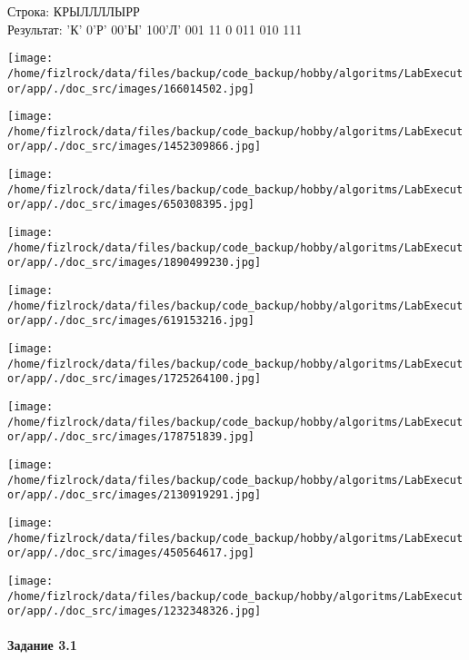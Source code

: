 \documentclass[a4paper, 12pt]{article}
\begin{document}
Строка: 
КРЫЛЛЛЛЫРР\\
Результат: 'К' 0'Р' 00'Ы' 100'Л' 001 11 0 011 010 111

\texttt{[image: /home/fizlrock/data/files/backup/code\_backup/hobby/algoritms/LabExecutor/app/./doc\_src/images/166014502.jpg]}

\texttt{[image: /home/fizlrock/data/files/backup/code\_backup/hobby/algoritms/LabExecutor/app/./doc\_src/images/1452309866.jpg]}

\texttt{[image: /home/fizlrock/data/files/backup/code\_backup/hobby/algoritms/LabExecutor/app/./doc\_src/images/650308395.jpg]}

\texttt{[image: /home/fizlrock/data/files/backup/code\_backup/hobby/algoritms/LabExecutor/app/./doc\_src/images/1890499230.jpg]}

\texttt{[image: /home/fizlrock/data/files/backup/code\_backup/hobby/algoritms/LabExecutor/app/./doc\_src/images/619153216.jpg]}

\texttt{[image: /home/fizlrock/data/files/backup/code\_backup/hobby/algoritms/LabExecutor/app/./doc\_src/images/1725264100.jpg]}

\texttt{[image: /home/fizlrock/data/files/backup/code\_backup/hobby/algoritms/LabExecutor/app/./doc\_src/images/178751839.jpg]}

\texttt{[image: /home/fizlrock/data/files/backup/code\_backup/hobby/algoritms/LabExecutor/app/./doc\_src/images/2130919291.jpg]}

\texttt{[image: /home/fizlrock/data/files/backup/code\_backup/hobby/algoritms/LabExecutor/app/./doc\_src/images/450564617.jpg]}

\texttt{[image: /home/fizlrock/data/files/backup/code\_backup/hobby/algoritms/LabExecutor/app/./doc\_src/images/1232348326.jpg]}
\pagebreak
\paragraph{Задание 3.1}
\end{document}
